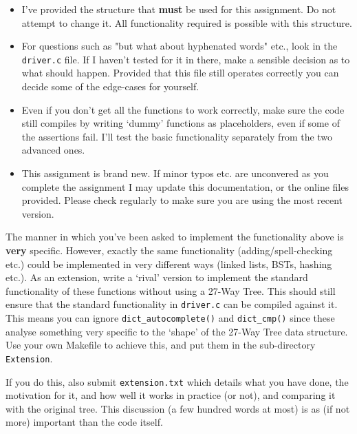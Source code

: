 \begin{exercise}
\begin{itemize}

\item I've provided the structure that {\bf must} be used for this assignment.
Do not attempt to change it. All functionality required is possible with
this structure.

\item For questions such as "but what about hyphenated words" etc., look
in the \verb^driver.c^ file. If I haven't tested for it in there, make a
sensible decision as to what should happen. Provided that this file still
operates correctly you can decide some of the edge-cases for yourself.

\item Even if you don't get all the functions to work correctly, make
sure the code still compiles by writing `dummy' functions as placeholders,
even if some of the assertions fail. I'll test the basic functionality
separately from the two advanced ones.

\item This assignment is brand new. If minor typos
etc. are unconvered as you complete the assignment I
may update this documentation, or the online files
provided. Please check regularly to make sure you
are using the most recent version.

\end{itemize}

\vspace*{1cm}
\vspace*{1ex}

\noindent
The manner in which you've been asked to implement the functionality above is {\bf very}
specific. However, exactly the same functionality (adding/spell-checking etc.)
could be implemented in very different ways (linked lists, BSTs, hashing etc.).
As an extension, write a `rival' version to implement
the standard functionality of these functions without using a 27-Way Tree.
This should still ensure that the standard functionality in \verb^driver.c^
can be compiled against it. This means you
can ignore \verb^dict_autocomplete()^ and \verb^dict_cmp()^ since these
analyse something very
specific to the `shape' of the 27-Way Tree data structure.  Use your own
Makefile to achieve this, and put them in the sub-directory 
\verb^Extension^.

If you do this, also submit \verb^extension.txt^ which details what you
have done, the motivation for it, and how well it works in practice (or
not), and comparing it with the original tree.
This discussion (a few hundred words at most) is as (if not more)
important than the code itself.


\end{exercise}
